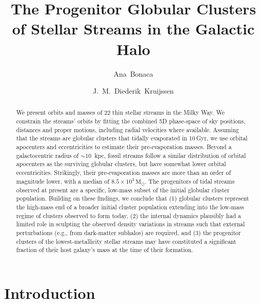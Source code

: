 \documentclass[twocolumn]{aastex63}
\newcommand{\msun}{\ensuremath{\textrm{M}_\odot}}
\begin{document}
\sloppy\sloppypar\raggedbottom\frenchspacing %

\title{The Progenitor Globular Clusters of Stellar Streams in the Galactic Halo}


\author[0000-0002-7846-9787]{Ana~Bonaca}

\author[0000-0002-8804-0212]{J.~M.~Diederik~Kruijssen}


\begin{abstract}\noindent %
We present orbits and masses of 22 thin stellar streams in the Milky Way.
We constrain the streams' orbits by fitting the combined 5D phase-space of sky positions, distances and proper motions, including radial velocities where available.
Assuming that the streams are globular clusters that tidally evaporated in 10\,Gyr, we use orbital apocenters and eccentricities to estimate their pre-evaporation masses.
Beyond a galactocentric radius of $\sim10$~kpc, fossil streams follow a similar distribution of orbital apocenters as the surviving globular clusters, but have somewhat lower orbital eccentricities.
Strikingly, their pre-evaporation masses are more than an order of magnitude lower, with a median of $8.5\times10^3\,\msun$.
The progenitors of tidal streams observed at present are a specific, low-mass subset of the initial globular cluster population.
Building on these findings, we conclude that (1) globular clusters represent the high-mass end of a broader initial cluster population extending into the low-mass regime of clusters observed to form today,
(2) the internal dynamics plausibly had a limited role in sculpting the observed density variations in streams such that external perturbations (e.g., from dark-matter subhalos) are required, and
(3) the progenitor clusters of the lowest-metallicity stellar streams may have constituted a significant fraction of their host galaxy's mass at the time of their formation.
\end{abstract}

\section{Introduction}
\label{sec:intro}
\end{document}

